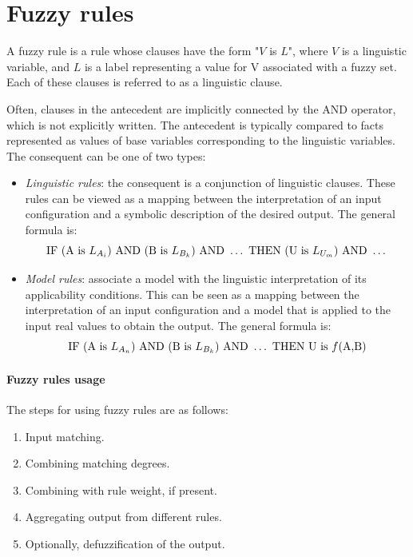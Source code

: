 \section{Fuzzy rules}

\begin{definition}
    A fuzzy rule is a rule whose clauses have the form "$V$ is $L$", where $V$ is a linguistic variable, and $L$ is a label representing a value for V associated with a fuzzy set.
    Each of these clauses is referred to as a linguistic clause. 
\end{definition}
Often, clauses in the antecedent are implicitly connected by the AND operator, which is not explicitly written.
The antecedent is typically compared to facts represented as values of base variables corresponding to the linguistic variables. 
The consequent can be one of two types:
\begin{itemize}
    \item \textit{Linguistic rules}: the consequent is a conjunction of linguistic clauses. 
        These rules can be viewed as a mapping between the interpretation of an input configuration and a symbolic description of the desired output. 
        The general formula is:
        \[\textnormal{IF }(\textnormal{A is }L_{A_i})\textnormal{ AND }(\textnormal{B is }L_{B_k})\textnormal{ AND }\dots\textnormal{ THEN }(\textnormal{U is }L_{U_m})\textnormal{ AND }\dots\]
    \item \textit{Model rules}: associate a model with the linguistic interpretation of its applicability conditions. 
        This can be seen as a mapping between the interpretation of an input configuration and a model that is applied to the input real values to obtain the output. 
        The general formula is:
        \[\textnormal{IF }(\textnormal{A is }L_{A_n})\textnormal{ AND }(\textnormal{B is }L_{B_k})\textnormal{ AND }\dots\textnormal{ THEN } \textnormal{U is } f(\textnormal{A,B})\]
\end{itemize}

\paragraph*{Fuzzy rules usage}
The steps for using fuzzy rules are as follows:
\begin{enumerate}
    \item Input matching.
    \item Combining matching degrees.
    \item Combining with rule weight, if present.
    \item Aggregating output from different rules.
    \item Optionally, defuzzification of the output.
\end{enumerate}

